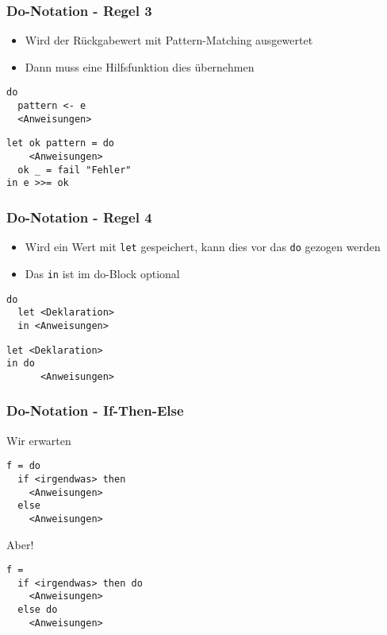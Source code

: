 \begin{frame}[fragile]
\frametitle{Do-Notation - Regel 3}
\begin{block}{\vspace*{-3ex}}
\begin{itemize}
\item Wird der Rückgabewert mit Pattern-Matching ausgewertet
\item Dann muss eine Hilfsfunktion dies übernehmen
\end{itemize}
\end{block}
\begin{lstlisting}
do 
  pattern <- e
  <Anweisungen>
\end{lstlisting}	
\pause
\begin{lstlisting}
let ok pattern = do 
    <Anweisungen>
  ok _ = fail "Fehler" 
in e >>= ok
\end{lstlisting}	
\end{frame}

\begin{frame}[fragile]
\frametitle{Do-Notation - Regel 4}
\begin{block}{\vspace*{-3ex}}
\begin{itemize}
\item Wird ein Wert mit \lstinline|let| gespeichert, kann dies vor das \lstinline|do| gezogen werden
\item Das \lstinline|in| ist im do-Block optional
\end{itemize}
\end{block}
\begin{lstlisting}
do 
  let <Deklaration>
  in <Anweisungen>
\end{lstlisting}	
\pause
\begin{lstlisting}
let <Deklaration>
in do
      <Anweisungen>
\end{lstlisting}	
\end{frame}

\begin{frame}[fragile]
\frametitle{Do-Notation - If-Then-Else}
\begin{block}{Wir erwarten}
\begin{lstlisting}
f = do 
  if <irgendwas> then
    <Anweisungen>
  else 
    <Anweisungen>
\end{lstlisting}	
\end{block}
\vspace*{-3ex}
\begin{block}{Aber!}
\begin{lstlisting}
f = 
  if <irgendwas> then do
    <Anweisungen>
  else do
    <Anweisungen>
\end{lstlisting}	
\end{block}
\end{frame}

